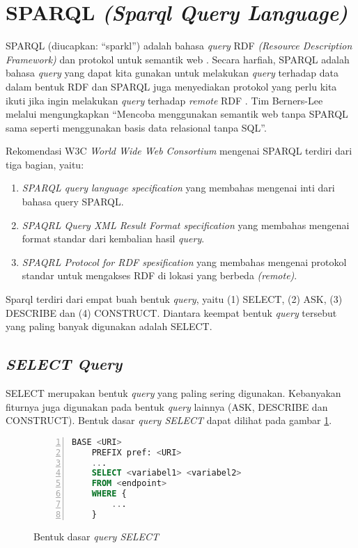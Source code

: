 \section{SPARQL \emph{(Sparql Query Language)}}
SPARQL (diucapkan: ``sparkl'') adalah bahasa \emph{query} RDF \emph{(Resource Description Framework)} dan protokol untuk semantik web \citep{liyang_yu}. Secara harfiah, SPARQL adalah bahasa \emph{query} yang dapat kita gunakan untuk melakukan \emph{query} terhadap data dalam bentuk RDF dan SPARQL juga menyediakan protokol yang perlu kita ikuti jika ingin melakukan \emph{query} terhadap \emph{remote} RDF \citep{liyang_yu}. Tim Berners-Lee melalui \citet{ducharme} mengungkapkan ``Mencoba menggunakan semantik web tanpa SPARQL sama seperti menggunakan basis data relasional tanpa SQL''.

Rekomendasi W3C \emph{World Wide Web Consortium} mengenai SPARQL terdiri dari tiga bagian, yaitu:

\begin{enumerate}
	\item \emph{SPARQL query language specification} yang membahas mengenai inti dari bahasa query SPARQL.
	\item \emph{SPAQRL Query XML Result Format specification} yang membahas mengenai format standar dari kembalian hasil \emph{query}.
	\item \emph{SPAQRL Protocol for RDF spesification} yang membahas mengenai protokol standar untuk mengakses RDF di lokasi yang berbeda \emph{(remote)}.
\end{enumerate}

Sparql terdiri dari empat buah bentuk \emph{query}, yaitu (1) SELECT, (2) ASK, (3) DESCRIBE dan (4) CONSTRUCT. Diantara keempat bentuk \emph{query} tersebut yang paling banyak digunakan adalah SELECT.

\subsection{\emph{SELECT Query}}
SELECT merupakan bentuk \emph{query} yang paling sering digunakan. Kebanyakan fiturnya juga digunakan pada bentuk \emph{query} lainnya (ASK, DESCRIBE dan CONSTRUCT). Bentuk dasar \emph{query SELECT} dapat dilihat pada gambar \ref{fig:bentuk_query_select}.
\begin{figure}[b]
	\centering
	\begin{lstlisting}[language=SQL, xleftmargin=15pt, numbers=left]
 	BASE <URI>
 	PREFIX pref: <URI>
 	...
 	SELECT <variabel1> <variabel2>
 	FROM <endpoint>
 	WHERE {
 		...
 	}\end{lstlisting} 
	\caption{Bentuk dasar \emph{query SELECT} \citep{liyang_yu}}
	\label{fig:bentuk_query_select}
\end{figure}

